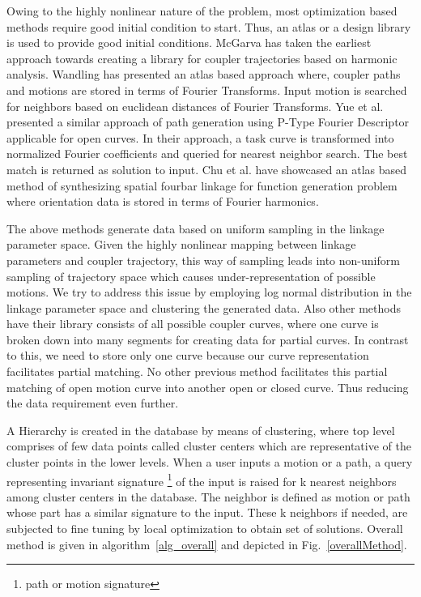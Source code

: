 \documentclass[twocolumn,10pt]{asme2e}
\begin{document}
Owing to the highly nonlinear nature of the problem, most optimization based methods require good initial condition to start.
Thus, an atlas or a design library is used to provide good initial conditions.
McGarva\cite{mcgarva1994} has taken the earliest approach towards creating a library for coupler trajectories based on harmonic analysis.
Wandling\cite{wandling2000} has presented an atlas based approach where, coupler paths and motions are stored in terms of Fourier Transforms.
Input motion is searched for neighbors based on euclidean distances of Fourier Transforms.
Yue et al.\cite{yue-pathgen2011} presented a similar approach of path generation using P-Type Fourier Descriptor applicable for open curves.
In their approach, a task curve is transformed into normalized Fourier coefficients and queried for nearest neighbor search.
The best match is returned as solution to input. Chu et al.\cite{chu2010} have showcased an atlas based method of synthesizing spatial fourbar linkage for function generation problem where orientation data is stored in terms of Fourier harmonics.

The above methods generate data based on uniform sampling in the linkage parameter space.
Given the highly nonlinear mapping between linkage parameters and coupler trajectory, this way of sampling leads into non-uniform sampling of trajectory space which causes under-representation of possible motions.
We try to address this issue by employing log normal distribution in the linkage parameter space and clustering the generated data.
Also other methods have their library consists of all possible coupler curves, where one curve is broken down into many segments for creating data for partial curves.
In contrast to this, we need to store only one curve because our curve representation facilitates partial matching.
No other previous method facilitates this partial matching of open motion curve into another open or closed curve.
Thus reducing the data requirement even further.

A Hierarchy is created in the database by means of clustering, where top level comprises of few data points called cluster centers which are representative of the cluster points in the lower levels.
When a user inputs a motion or a path, a query representing invariant signature \footnote{path or motion signature} of the input is raised for k nearest neighbors among cluster centers in the database.
The neighbor is defined as motion or path whose part has a similar signature to the input. These k neighbors if needed, are subjected to fine tuning by local optimization to obtain set of solutions. Overall method is given in algorithm~\ref{alg_overall} and depicted in Fig.~\ref{overallMethod}.
\end{document}
